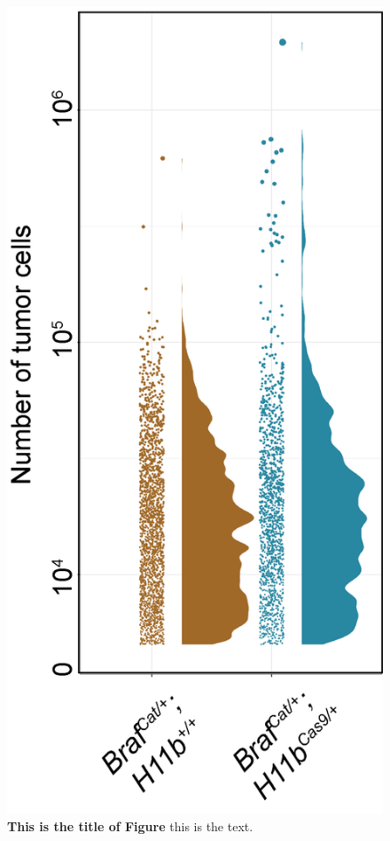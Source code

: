 \begin{figure}
\hypertarget{fig:05}{%
\centering
\includegraphics[width=1\textwidth,height=\textheight]{images/tuba2.png}
\caption{\textbf{This is the title of Figure} this is the text.}\label{fig:05}
}
\end{figure}

